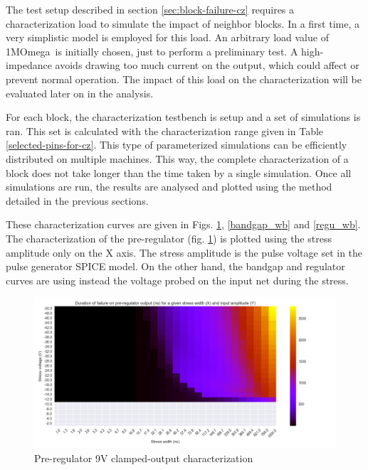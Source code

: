 The test setup described in section \ref{sec:block-failure-cz} requires a characterization load to simulate the impact of neighbor blocks.
In a first time, a very simplistic model is employed for this load.
An arbitrary load value of 1M\textgreek{Omega}\ is initially chosen, just to perform a preliminary test.
A high-impedance avoids drawing too much current on the output, which could affect or prevent normal operation.
The impact of this load on the characterization will be evaluated later on in the analysis.

For each block, the characterization testbench is setup and a set of simulations is ran.
This set is calculated with the characterization range given in Table \ref{selected-pins-for-cz}.
This type of parameterized simulations can be efficiently distributed on multiple machines.
This way, the complete characterization of a block does not take longer than the time taken by a single simulation.
Once all simulations are run, the results are analysed and plotted using the method detailed in the previous sections.

These characterization curves are given in Figs. \ref{pre_regu_wb}, \ref{bandgap_wb} and \ref{regu_wb}.
The characterization of the pre-regulator (fig. \ref{pre_regu_wb}) is plotted using the stress amplitude only on the X axis.
The stress amplitude is the pulse voltage set in the pulse generator SPICE model.
On the other hand, the bandgap and regulator curves are using instead the voltage probed on the input net during the stress.



\begin{figure}[!htbp]
  \centering
  \includegraphics[width=\textwidth]{src/4/figures/preregulator_cz.png}
  \caption{Pre-regulator 9V clamped-output characterization}
  \label{pre_regu_wb}
\end{figure}


